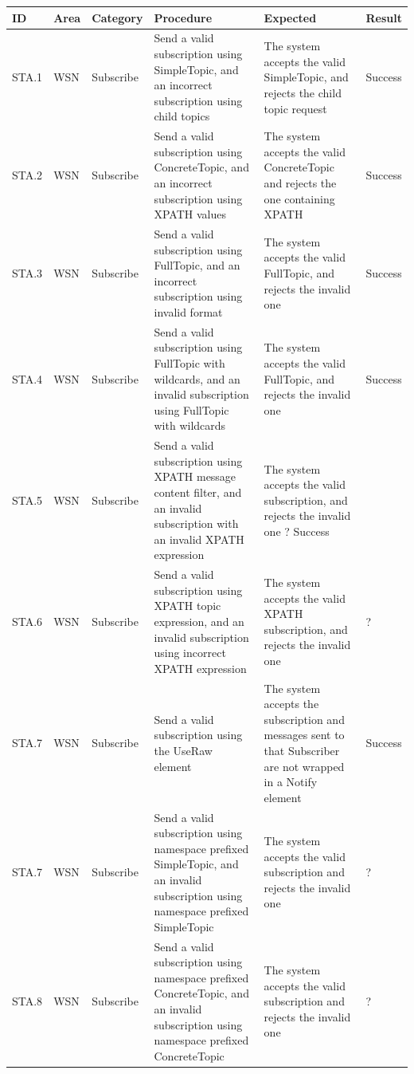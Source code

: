 \begin{table}[ht!]
\tiny
\begin{tabular}{|m{0.5cm}|m{1.2cm}|m{1.2cm}|m{3.3cm}|m{3.3cm}|m{1.5cm}|}
\hline
\rowcolor{lightgray}
\textbf{ID} & \textbf{Area} & \textbf{Category} & \textbf{Procedure} & \textbf{Expected} & \textbf{Result}\\ \hline
STA.1 & WSN & Subscribe & Send a valid subscription using SimpleTopic, and an incorrect subscription using child topics & The system accepts the valid SimpleTopic, and rejects the child topic request & Success \\ \hline
STA.2 & WSN & Subscribe & Send a valid subscription using ConcreteTopic, and an incorrect subscription using XPATH values & The system accepts the valid ConcreteTopic and rejects the one containing XPATH & Success \\ \hline
STA.3 & WSN & Subscribe & Send a valid subscription using FullTopic, and an incorrect subscription using invalid format & The system accepts the valid FullTopic, and rejects the invalid one & Success \\ \hline
STA.4 & WSN & Subscribe & Send a valid subscription using FullTopic with wildcards, and an invalid subscription using FullTopic with wildcards & The system accepts the valid FullTopic, and rejects the invalid one & Success \\ \hline
STA.5 & WSN & Subscribe & Send a valid subscription using XPATH message content filter, and an invalid subscription with an invalid XPATH expression & The system accepts the valid subscription, and rejects the invalid one ? Success \\ \hline
STA.6 & WSN & Subscribe & Send a valid subscription using XPATH topic expression, and an invalid subscription using incorrect XPATH expression & The system accepts the valid XPATH subscription, and rejects the invalid one & ? \\ \hline
STA.7 & WSN & Subscribe & Send a valid subscription using the UseRaw element & The system accepts the subscription and messages sent to that Subscriber are not wrapped in a Notify element & Success \\ \hline
STA.7 & WSN & Subscribe & Send a valid subscription using namespace prefixed SimpleTopic, and an invalid subscription using namespace prefixed SimpleTopic & The system accepts the valid subscription and rejects the invalid one & ? \\ \hline
STA.8 & WSN & Subscribe & Send a valid subscription using namespace prefixed ConcreteTopic, and an invalid subscription using namespace prefixed ConcreteTopic & The system accepts the valid subscription and rejects the invalid one & ? \\ \hline

\end{tabular}
\end{table}
